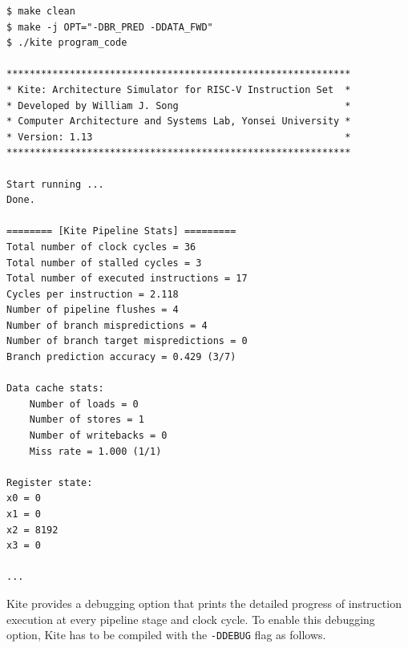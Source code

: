 \documentclass[10pt]{article}
\begin{document}
\begin{Verbatim}[frame=single,fontsize=\small]
$ make clean
$ make -j OPT="-DBR_PRED -DDATA_FWD"
$ ./kite program_code

************************************************************
* Kite: Architecture Simulator for RISC-V Instruction Set  *
* Developed by William J. Song                             *
* Computer Architecture and Systems Lab, Yonsei University *
* Version: 1.13                                            *
************************************************************

Start running ...
Done.

======== [Kite Pipeline Stats] =========
Total number of clock cycles = 36
Total number of stalled cycles = 3
Total number of executed instructions = 17
Cycles per instruction = 2.118
Number of pipeline flushes = 4
Number of branch mispredictions = 4
Number of branch target mispredictions = 0
Branch prediction accuracy = 0.429 (3/7)

Data cache stats:
    Number of loads = 0
    Number of stores = 1
    Number of writebacks = 0
    Miss rate = 1.000 (1/1)

Register state:
x0 = 0
x1 = 0
x2 = 8192
x3 = 0

...

\end{Verbatim}

Kite provides a debugging option that prints the detailed progress of instruction execution at every pipeline stage and clock cycle.
To enable this debugging option, Kite has to be compiled with the {\tt\small -DDEBUG} flag as follows.
\end{document}
